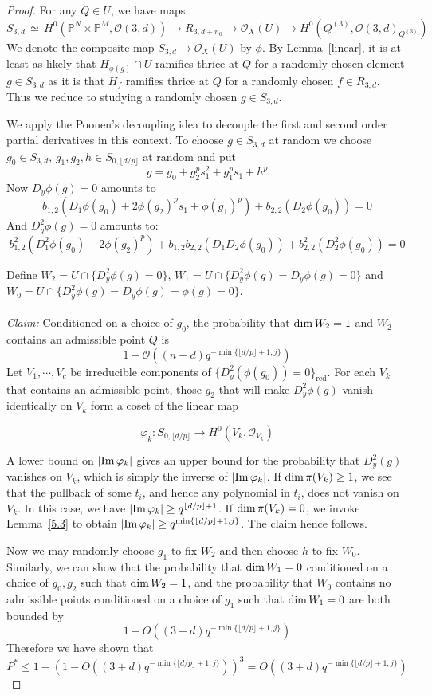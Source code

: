 \documentclass[12pt]{article}
\theoremstyle{plain}
\theoremstyle{definition}
\newcommand{\IP}{\mathbb{P}}
\newcommand{\sO}{\mathcal{O}}
\renewcommand\dim{{\rm dim\,}}
\newcommand{\im}{{\rm Im\,}}
\newcommand\iso{{\, \simeq \,}}
\newcommand{\<}{\langle}
\renewcommand{\>}{\rangle}
\begin{document}
\begin{proof}
For any $Q \in U$, we have maps
$$ S_{3, d} \iso H^0(\IP^N \times \IP^M, \sO(3, d)) \to R_{3, d + n_0} \to \sO_X(U) \to H^0(Q^{(3)}, \sO(3, d)_{Q^{(3)}}) $$ 
We denote the composite map $S_{3, d} \to \sO_X(U)$ by $\phi$. By Lemma~\ref{linear}, it is at least as likely that $H_{\phi(g)} \cap U$ ramifies thrice at $Q$ for a randomly chosen element $g \in S_{3, d}$ as it is that $H_f$ ramifies thrice at $Q$ for a randomly chosen $f \in R_{3, d}$. Thus we reduce to studying a randomly chosen $g \in S_{3, d}$. 

We apply the Poonen's decoupling idea to decouple the first and second order partial derivatives in this context. To choose $g \in S_{3, d}$ at random we choose $g_0 \in S_{3, d}$, $g_1, g_2, h \in S_{0, \lfloor d/p \rfloor} $ at random and put 
$$ g = g_0 + g_{2}^p s_1^2 + g^p_{1} s_1 + h^p $$
Now $D_y \phi(g) = 0$ amounts to 
$$b_{1, 2} ( D_1 \phi(g_0) + 2 \phi(g_{2})^p s_1 + \phi(g_{1})^p) + b_{2, 2}(D_2 \phi(g_0)) = 0 $$
And $D_y^2 \phi(g) = 0$ amounts to: 
$$ b_{1, 2}^2 (D_1^2 \phi(g_0) + 2 \phi(g_{2})^p) + b_{1, 2}b_{2, 2} (D_1 D_2 \phi(g_0)) + b_{2, 2}^2(D_2^2 \phi(g_0)) = 0 $$


Define $W_2 = U \cap \{ D_y^2 \phi(g) = 0 \}$, $W_1 = U \cap \{D_y^2 \phi(g) = D_y \phi(g) = 0\}$ and $W_0 = U \cap \{ D_y^2 \phi(g) = D_y \phi(g) = \phi(g) = 0\}$. \\\\
\textit{Claim: }Conditioned on a choice of $g_0$, the probability that $\dim W_2 = 1$ and $W_2$ contains an admissible point $Q$ is $$1 - \sO((n + d)q^{- \min\{ \lfloor d/p \rfloor + 1, j\}})$$ Let $V_1, \cdots, V_c$ be irreducible components of $\{D_y^2(\phi(g_0)) = 0\}_{\mathrm{red}}$.    
For each $V_k$ that contains an admissible point, those $g_2$ that will make $D_y^2 \phi(g)$ vanish identically on $V_k$ form a coset of the linear map 

$$ \varphi_k : S_{0, \lfloor d/p \rfloor} \to H^0(V_k, \sO_{V_k})$$ 

A lower bound on $|\im \varphi_k|$ gives an upper bound for the probability that $D_y^2(g)$ vanishes on $V_k$, which is simply the inverse of $|\im \varphi_k|$. If $\dim \pi(V_k) \ge 1$, we see that the pullback of some $t_i$, and hence any polynomial in $t_i$, does not vanish on $V_k$. In this case, we have $|\im \varphi_k| \ge q^{\lfloor d/p \rfloor + 1}$. If $\dim \pi(V_k) = 0$, we invoke Lemma~\ref{5.3} to obtain $|\im \varphi_k| \ge q^{\min \{\lfloor d/p \rfloor + 1, j \}  }$. The claim hence follows. 

Now we may randomly choose $g_1$ to fix $W_2$ and then choose $h$ to fix $W_0$. Similarly, we can show that the probability that $\dim W_1 = 0$ conditioned on a choice of $g_0, g_2$ such that $\dim W_2 = 1$, and the probability that $W_0$ contains no admissible points conditioned on a choice of $g_1$ such that $\dim W_1 = 0$ are both bounded by $$1 - O((3 + d)q^{- \min\{ \lfloor d/p \rfloor + 1, j\}})$$
Therefore we have shown that 
$$ P^* \le 1 - (1 - O((3 + d)q^{- \min\{ \lfloor d/p \rfloor + 1, j\}}))^3 = O((3 + d)q^{- \min\{ \lfloor d/p \rfloor + 1, j\}}) $$  

\end{proof}
\end{document}
